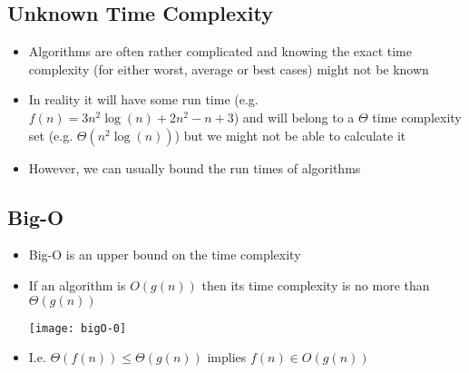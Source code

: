 
\begin{slide}
\section{Unknown Time Complexity}

\begin{PauseHighLight}
  \begin{itemize}
  \item Algorithms are often rather complicated and knowing the exact
    time complexity (for either worst, average or best cases) might not
    be known\pause
  \item In reality it will have some run time (e.g. $f(n)=3n^2\log(n) +2
    n^2-n+3$) and will belong to a $\Theta$ time complexity set
    (e.g. $\Theta(n^2 \log(n))$) but we might not be able to calculate
    it\pause
  \item However, we can usually bound the run times of algorithms\pause
  \end{itemize}
\end{PauseHighLight}

\end{slide}




\begin{slide}
\section{Big-O}

\begin{PauseHighLight}
  \begin{itemize}
  \item Big-O is an upper bound on the time complexity\pause
  \item If an algorithm is $O(g(n))$ then its time complexity is no more
    than $\Theta(g(n))$
    \begin{center}
      \texttt{[image: bigO-0]}\pause
    \end{center}
  \item I.e. $\Theta(f(n))\leq\Theta(g(n))$ implies $f(n) \in O(g(n))$\pause
  \end{itemize}
\end{PauseHighLight}

\end{slide}

